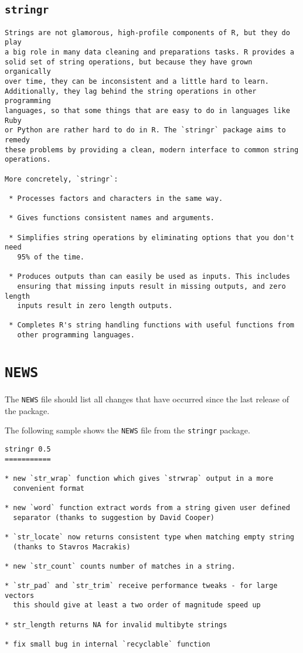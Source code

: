 \subsection{\texttt{stringr}}

\begin{verbatim}
Strings are not glamorous, high-profile components of R, but they do play
a big role in many data cleaning and preparations tasks. R provides a
solid set of string operations, but because they have grown organically
over time, they can be inconsistent and a little hard to learn.
Additionally, they lag behind the string operations in other programming
languages, so that some things that are easy to do in languages like Ruby
or Python are rather hard to do in R. The `stringr` package aims to remedy
these problems by providing a clean, modern interface to common string
operations.

More concretely, `stringr`:

 * Processes factors and characters in the same way.

 * Gives functions consistent names and arguments.

 * Simplifies string operations by eliminating options that you don't need
   95% of the time.

 * Produces outputs than can easily be used as inputs. This includes
   ensuring that missing inputs result in missing outputs, and zero length
   inputs result in zero length outputs.

 * Completes R's string handling functions with useful functions from
   other programming languages.
\end{verbatim}

\section{\texttt{NEWS}}

The \texttt{NEWS} file should list all changes that have occurred since
the last release of the package.

The following sample shows the \texttt{NEWS} file from the
\texttt{stringr} package.

\begin{verbatim}
stringr 0.5
===========

* new `str_wrap` function which gives `strwrap` output in a more
  convenient format

* new `word` function extract words from a string given user defined
  separator (thanks to suggestion by David Cooper)

* `str_locate` now returns consistent type when matching empty string
  (thanks to Stavros Macrakis)

* new `str_count` counts number of matches in a string.

* `str_pad` and `str_trim` receive performance tweaks - for large vectors
  this should give at least a two order of magnitude speed up

* str_length returns NA for invalid multibyte strings

* fix small bug in internal `recyclable` function
\end{verbatim}

